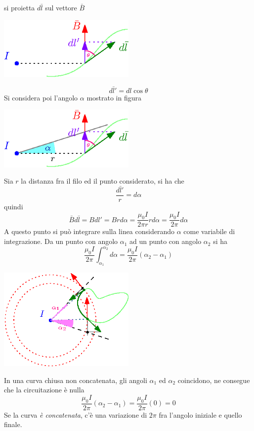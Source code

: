 \documentclass[10pt, letterpaper]{report}
\begin{document}
si proietta $d\bar l$ sul vettore $\bar B$
\begin{center}
    \includegraphics[width=0.5\textwidth ]{images/dimAmpere1.eps}
\end{center}
$$ d\bar l'=dl\cos\theta$$
Si considera poi l'angolo $\alpha$ mostrato in figura 
\begin{center}
    \includegraphics[width=0.5\textwidth ]{images/dimAmpere2.eps}
\end{center}
Sia $r$ la distanza fra il filo ed il punto considerato, si ha che 
$$ \frac{d\bar l'}{r}=d\alpha$$
quindi 
$$ \bar B d\bar l=Bdl'=Brd\alpha=\frac{\mu_0I}{2\pi r}rd\alpha = \frac{\mu_0I}{2\pi}d\alpha$$
A questo punto si può integrare sulla linea considerando $\alpha$ come variabile di integrazione. Da un punto con angolo $\alpha_1$ ad un punto con angolo $\alpha_2$ si ha 
$$  \frac{\mu_0I}{2\pi}\int_{\alpha_1}^{\alpha_2}d\alpha= \frac{\mu_0I}{2\pi}(\alpha_2-\alpha_1)$$
\begin{center}
    \includegraphics[width=0.5\textwidth ]{images/dimAmpere3.eps}
\end{center}
In una curva chiusa non concatenata, gli angoli $\alpha_1$ ed $\alpha_2$ coincidono, ne consegue che la circuitazione è nulla 
$$ \frac{\mu_0I}{2\pi}(\alpha_2-\alpha_1)= \frac{\mu_0I}{2\pi}(0)=0 $$
Se la curva \textit{è concatenata}, c'è una variazione di $2\pi$ fra l'angolo iniziale e quello finale.
\end{document}
